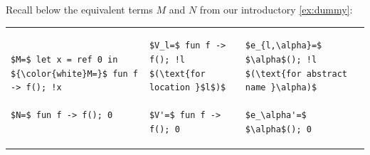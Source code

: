 
\begin{example}\label{ex:SL-dummy}
  Recall below the equivalent terms $M$ and $N$ from our introductory \cref{ex:dummy}:
  \medskip

\noindent
  \begin{tabular}{@{}l@{\quad}|@{\quad}l@{\quad}|@{\quad}l@{}}
\begin{lstlisting}[boxpos=m]
$M=$ let x = ref 0 in
${\color{white}M=}$ fun f -> f(); !x

$N=$ fun f -> f(); 0
\end{lstlisting}
  &
\begin{lstlisting}[boxpos=m]
$V_l=$ fun f -> f(); !l
$(\text{for location }$l$)$

$V'=$ fun f -> f(); 0
\end{lstlisting}
    &
      \begin{lstlisting}[boxpos=m]
$e_{l,\alpha}=$ $\alpha$(); !l
$(\text{for abstract name }\alpha)$

$e_\alpha'=$ $\alpha$(); 0
\end{lstlisting}
\end{tabular}
\medskip


\end{example}
